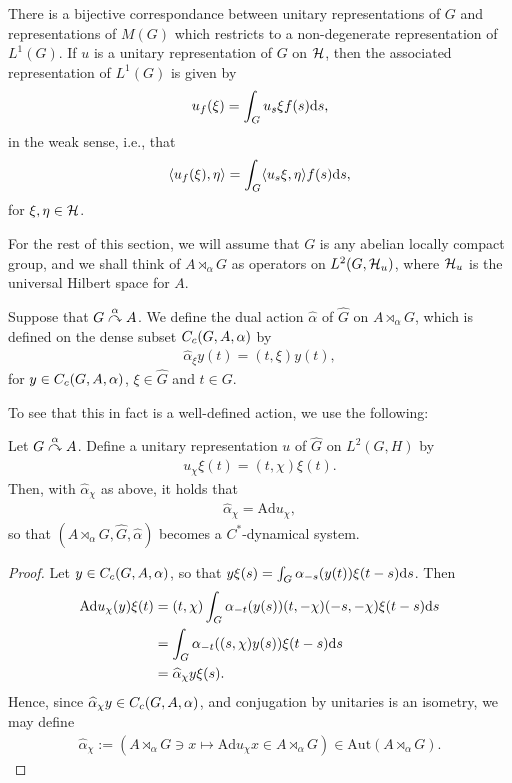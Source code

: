 \begin{proposition}
	There is a bijective correspondance between unitary representations of $G$ and representations of $M(G)$ which restricts to a non-degenerate representation of $L^1(G)$. If $u$ is a unitary representation of $G$ on $\mathcal{H}$, then the associated representation of $L^1(G)$ is given by
	\begin{align*}
		u_f(\xi) = \int_G u_s \xi f(s) \mathrm{d} s,
	\end{align*}
	in the weak sense, i.e., that 
	\begin{align*}
		\langle u_f(\xi), \eta \rangle = \int_G \langle u_s \xi, \eta \rangle f(s) \mathrm{d} s,
	\end{align*}
	for $\xi, \eta \in \mathcal{H}$.
\end{proposition}

For the rest of this section, we will assume that $G$ is any abelian locally compact group, and we shall think of $A \rtimes_\alpha G$ as operators on $L^2(G,\mathcal{H}_u)$, where $\mathcal{H}_u$ is the universal Hilbert space for $A$.
\begin{definition}
	Suppose that $G \stackrel{\alpha}{\curvearrowright} A$. We define the dual action $\hat \alpha$ of $\hat G$ on $A \rtimes_\alpha G$, which is defined on the dense subset $C_c(G,A,\alpha)$ by
	\begin{align*}
		\hat \alpha_\xi y(t) =  (t,\xi) y(t),
	\end{align*}
	for $y \in C_c(G,A,\alpha)$, $\xi \in \hat G$ and $t \in G$.
\end{definition}
To see that this in fact is a well-defined action, we use the following:
\begin{lemma}
	Let $G \stackrel{\alpha}{\curvearrowright} A$. Define a unitary representation $u$ of $\hat G$ on $L^2(G,H)$ by
	\begin{align*}
		u_\chi \xi(t) = (t, \chi) \xi(t).
	\end{align*}
	Then, with $\hat \alpha_\chi$ as above, it holds that
	\begin{align*}
		\hat \alpha_\chi = \mathrm{Ad} u_\chi,
	\end{align*}
	so that $(A \rtimes_\alpha G, \hat G, \hat \alpha)$ becomes a $C^*$-dynamical system.
\end{lemma}
\begin{proof}
	Let $y \in C_c(G,A,\alpha)$, so that $y \xi(s) = \int_G \alpha_{-s}(y(t))\xi(t-s) \mathrm{d} s$. Then
	\begin{align*}
		\mathrm{Ad} u_{\chi}(y) \xi(t) &= (t, \chi) \int_G \alpha_{-t}(y(s)) (t, - \chi)(-s,-\chi) \xi(t-s) \mathrm{d} s\\
		&= \int_G \alpha_{-t}( (s,\chi) y(s)) \xi(t-s) \mathrm{d} s \\
		&= \widehat{\alpha}_{\chi}y \xi(s).
	\end{align*}
	Hence, since $\widehat{\alpha}_\chi y \in C_c(G,A,\alpha)$, and conjugation by unitaries is an isometry, we may define 
	\begin{align*}
		\hat \alpha_\chi := (A \rtimes_\alpha G \ni x \mapsto \mathrm{Ad} u_\chi x \in A \rtimes_\alpha G) \in \mathrm{Aut}(A \rtimes_\alpha G).
	\end{align*}
\end{proof}
